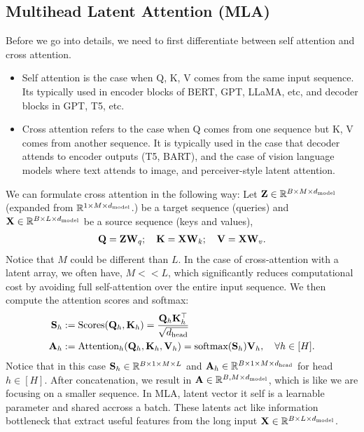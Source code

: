 \documentclass[11pt]{article}  %
\begin{document}
\subsection{Multihead Latent Attention (MLA)}
Before we go into details, we need to first differentiate between self attention and cross attention. 
\begin{itemize}
  \item Self attention is the case when Q, K, V comes from the same input sequence. Its typically used in encoder blocks of BERT, GPT, LLaMA, etc, and decoder blocks in GPT, T5, etc.
  \item Cross attention refers to the case when Q comes from one sequence but K, V comes from another sequence. It is typically used in the case that decoder attends to encoder outputs (T5, BART), and the case of vision language models where text attends to image, and perceiver-style latent attention.
\end{itemize}
We can formulate cross attention in the following way: Let $\mathbf{Z} \in \mathbb{R}^{B \times M \times d_{\text{model}}}$ (expanded from $\mathbb{R}^{1 \times M \times d_{\text{model}}}$.) be a target sequence (queries) and $\mathbf{X} \in \mathbb{R}^{B \times L \times d_{\text{model}}}$ be a source sequence (keys and values),
\begin{align}
  \mathbf{Q} = \mathbf{Z}\mathbf{W}_q; \quad \mathbf{K} = \mathbf{X}\mathbf{W}_k; \quad \mathbf{V} = \mathbf{X}\mathbf{W}_v.
\end{align}
Notice that $M$ could be different than $L$.
In the case of cross-attention with a latent array, we often have, $M << L$, which significantly reduces computational cost by avoiding full self-attention over the entire input sequence.
We then compute the attention scores and softmax:
\begin{align}
  \mathbf{S}_h &:= \text{Scores}(\mathbf{Q}_h, \mathbf{K}_{h}) = \frac{\mathbf{Q}_h\mathbf{K}^{\top}_{h}}{\sqrt{d_{\text{head}}}} \\
  \mathbf{A}_h &:= \text{Attention}_h (\mathbf{Q}_h, \mathbf{K}_{h}, \mathbf{V}_{h}) = \text{softmax}(\mathbf{S}_h)\mathbf{V}_{h}, \quad \forall h \in [H].
\end{align}
Notice that in this case $\mathbf{S}_h \in \mathbb{R}^{B \times 1 \times M \times L}$ and $\mathbf{A}_h \in \mathbb{R}^{B \times 1 \times M \times d_{\text{head}}}$ for head $h \in [H]$. 
After concatenation, we result in $\mathbf{A} \in \mathbb{R}^{B, M \times d_{\text{model}}}$, which is like we are focusing on a smaller sequence.
In MLA, latent vector it self is a learnable parameter and shared accross a batch. 
These latents act like information bottleneck that extract useful features from the long input $\mathbf{X} \in \mathbb{R}^{B \times L \times d_{\text{model}}}$.
\end{document}
